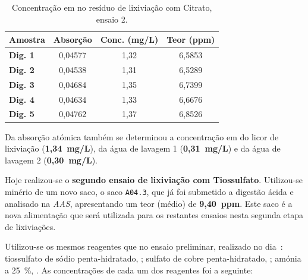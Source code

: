 \begin{table}[!ht]
    \centering
    \begin{tabularx}{\textwidth}{@{}lCCC@{}}
        \toprule
        \textbf{Amostra} & \textbf{Absorção} & \textbf{Conc. (mg/L)} & \textbf{Teor  (ppm)} \\ \midrule
        \textbf{Dig. 1} & 0,04577 & 1,32 & 6,5853 \\
        \textbf{Dig. 2} & 0,04538 & 1,31 & 6,5289 \\
        \textbf{Dig. 3} & 0,04684 & 1,35 & 6,7399 \\
        \textbf{Dig. 4} & 0,04634 & 1,33 & 6,6676 \\
        \textbf{Dig. 5} & 0,04762 & 1,37 & 6,8526 \\ \bottomrule
    \end{tabularx}
    \caption{Concentração em  no resíduo de lixiviação com Citrato, ensaio 2.}
    \label{tab:aas-concentracao-au-res-citrato2}
\end{table}

Da absorção atómica também se determinou a concentração em  do licor de lixiviação (\textbf{1,34~mg/L}), da água de lavagem 1 (\textbf{0,31~mg/L}) e da água de lavagem 2 (\textbf{0,30~mg/L}).

\hrulefill


Hoje realizou-se o \textbf{segundo ensaio de lixiviação com Tiossulfato}.
Utilizou-se minério de um novo saco, o saco \texttt{A04.3}, que já foi submetido a digestão ácida e analisado na \emph{AAS}, apresentando um teor (médio) de \textbf{9,40~ppm}.
Este saco é a nova alimentação que será utilizada para os restantes ensaios nesta segunda etapa de lixiviações.


Utilizou-se os mesmos reagentes que no ensaio preliminar, realizado no dia~: tiossulfato de sódio penta-hidratado, \tsp{}; sulfato de cobre penta-hidratado, \sulfcu{}; amónia a 25~\%, \amo{}.
As concentrações de cada um dos reagentes foi a seguinte:

